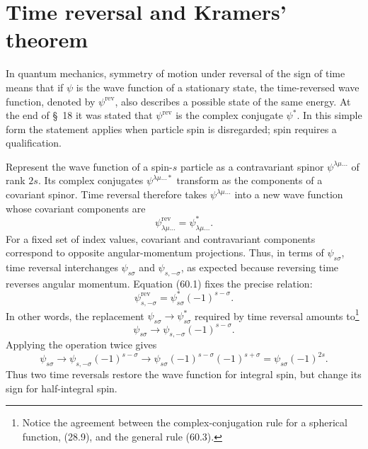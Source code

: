 \section{Time reversal and Kramers' theorem}

In quantum mechanics, symmetry of motion under reversal of the sign of time
means that if $\psi$ is the wave function of a stationary state, the
time-reversed wave function, denoted by $\psi^{\text{rev}}$, also describes a
possible state of the same energy. At the end of \S~18 it was stated that
$\psi^{\text{rev}}$ is the complex conjugate $\psi^*$. In this simple form the
statement applies when particle spin is disregarded; spin requires a
qualification.

Represent the wave function of a spin-$s$ particle as a contravariant spinor
$\psi^{\lambda\mu\ldots}$ of rank $2s$. Its complex conjugates
$\psi^{\lambda\mu\ldots*}$ transform as the components of a covariant spinor.
Time reversal therefore takes $\psi^{\lambda\mu\ldots}$ into a new wave
function whose covariant components are
\begin{equation}
 \psi^{\text{rev}}_{\lambda\mu\ldots}=\psi_{\lambda\mu\ldots}^*.
 \tag{60.1}
\end{equation}
For a fixed set of index values, covariant and contravariant components
correspond to opposite angular-momentum projections. Thus, in terms of
$\psi_{s\sigma}$, time reversal interchanges $\psi_{s\sigma}$ and
$\psi_{s,-\sigma}$, as expected because reversing time reverses angular
momentum. Equation (60.1) fixes the precise relation:
\begin{equation}
 \psi^{\text{rev}}_{s,-\sigma}=\psi_{s\sigma}^*(-1)^{s-\sigma}.
 \tag{60.2}
\end{equation}
In other words, the replacement
$\psi_{s\sigma}\longrightarrow\psi_{s\sigma}^*$ required by time reversal
amounts to\footnote{Notice the agreement between the complex-conjugation rule
for a spherical function, (28.9), and the general rule (60.3).}
\begin{equation}
 \psi_{s\sigma}\longrightarrow\psi_{s,-\sigma}(-1)^{s-\sigma}.
 \tag{60.3}
\end{equation}
Applying the operation twice gives
\[
 \psi_{s\sigma}\longrightarrow\psi_{s,-\sigma}(-1)^{s-\sigma}
 \longrightarrow\psi_{s\sigma}(-1)^{s-\sigma}(-1)^{s+\sigma}
 =\psi_{s\sigma}(-1)^{2s}.
\]
Thus two time reversals restore the wave function for integral spin, but
change its sign for half-integral spin.

